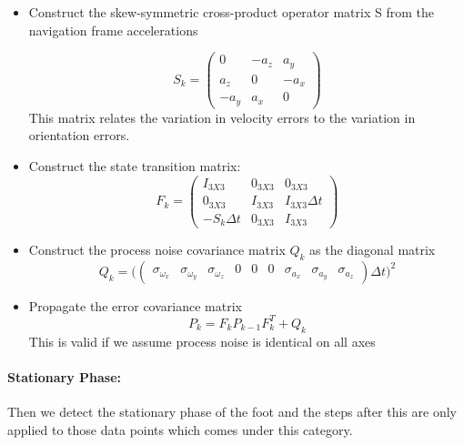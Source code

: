 \documentclass[12pt]{article}
\begin{document}
\begin{itemize}
\item Construct the skew-symmetric cross-product operator matrix S from the navigation frame accelerations

\begin{equation}
S_k = \begin{pmatrix}
0 & -a_z & a_y\\
a_z & 0 & -a_x\\
-a_y & a_x & 0
\end{pmatrix}
\end{equation}
This matrix relates the variation in velocity errors to the variation in orientation errors.

\item Construct the state  transition matrix:
\begin{equation}
F_k = \begin{pmatrix}
I_{3X3} & 0_{3X3} & 0_{3X3}\\
0_{3X3} & I_{3X3} & I_{3X3} \Delta t \\
-S_k \Delta t & 0_{3X3} & I_{3X3}
\end{pmatrix}
\end{equation}

\item Construct the process noise covariance matrix $ Q_k $ as the diagonal matrix
\begin{equation}
Q_k = \bigg( 
\begin{pmatrix}
\sigma_{\omega_x} & \sigma_{\omega_y} & \sigma_{\omega_z} & 0 & 0 & 0 & \sigma_{a_x} & \sigma_{a_y} & \sigma_{a_z}
\end{pmatrix}
\Delta t
\bigg)^2
\end{equation}

\item Propagate the error covariance matrix
\begin{equation}
P_k = F_kP_{k-1}F_k^T+Q_k
\end{equation}
This is valid if we assume process noise is identical on all axes
\end{itemize}

\paragraph{Stationary Phase: }
Then we detect the stationary phase of the foot and the steps after this are only applied to those data points which comes under this category.
\end{document}
